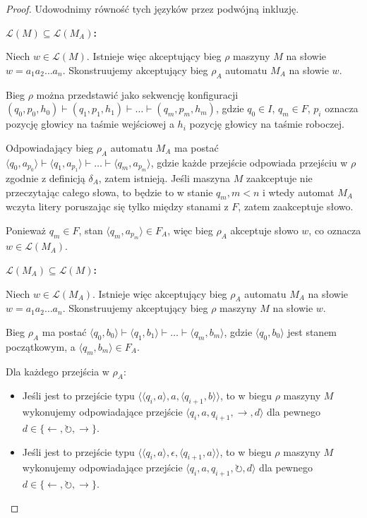 \documentclass{article}
\theoremstyle{definition}
\theoremstyle{remark}
\begin{document}
\begin{proof}
Udowodnimy równość tych języków przez podwójną inkluzję.

\medskip
\noindent\textbf{$\mathcal{L}(M) \subseteq \mathcal{L}(M_A)$:}

Niech $w \in \mathcal{L}(M)$. Istnieje więc akceptujący bieg $\rho$ maszyny $M$ na słowie $w = a_1a_2\ldots a_n$. 
Skonstruujemy akceptujący bieg $\rho_A$ automatu $M_A$ na słowie $w$.

Bieg $\rho$ można przedstawić jako sekwencję konfiguracji $(q_0, p_0, h_0) \vdash (q_1, p_1, h_1) \vdash \ldots \vdash (q_m, p_m, h_m)$, gdzie $q_0 \in I$, $q_m \in F$, $p_i$ oznacza pozycję głowicy na taśmie wejściowej a $h_i$ pozycję głowicy na taśmie roboczej.

Odpowiadający bieg $\rho_A$ automatu $M_A$ ma postać $\langle q_0, a_{p_0} \rangle \vdash \langle q_1, a_{p_1} \rangle \vdash \ldots \vdash \langle q_m, a_{p_m} \rangle$, gdzie każde przejście odpowiada przejściu w $\rho$ zgodnie z definicją $\delta_A$, zatem istnieją.
Jeśli maszyna $M$ zaakceptuje nie przeczytając całego słowa,
to będzie to w stanie \(q_m, m < n\) i wtedy automat \(M_A\) wczyta litery poruszając się tylko między stanami z \(F\), zatem zaakceptuje słowo. 

Ponieważ $q_m \in F$, stan $\langle q_m, a_{p_m} \rangle \in F_A$, więc bieg $\rho_A$ akceptuje słowo $w$, co oznacza $w \in \mathcal{L}(M_A)$.

\medskip
\noindent\textbf{$\mathcal{L}(M_A) \subseteq \mathcal{L}(M)$:}

Niech $w \in \mathcal{L}(M_A)$. Istnieje więc akceptujący bieg $\rho_A$ automatu $M_A$ na słowie $w = a_1a_2\ldots a_n$. 
Skonstruujemy akceptujący bieg $\rho$ maszyny $M$ na słowie $w$.

Bieg $\rho_A$ ma postać $\langle q_0, b_0 \rangle \vdash \langle q_1, b_1 \rangle \vdash \ldots \vdash \langle q_m, b_m \rangle$, gdzie $\langle q_0, b_0 \rangle$ jest stanem początkowym, a $\langle q_m, b_m \rangle \in F_A$.

Dla każdego przejścia w $\rho_A$:
\begin{itemize}
    \item Jeśli jest to przejście typu $\langle \langle q_i, a \rangle, a, \langle q_{i+1}, b \rangle \rangle$, to w biegu $\rho$ maszyny $M$ wykonujemy odpowiadające przejście $\langle q_i, a, q_{i+1}, \rightarrow, d \rangle$ dla pewnego $d \in \{\leftarrow, \circlearrowright, \rightarrow\}$.
    
    \item Jeśli jest to przejście typu $\langle \langle q_i, a \rangle, \epsilon, \langle q_{i+1}, a \rangle \rangle$, to w biegu $\rho$ maszyny $M$ wykonujemy odpowiadające przejście $\langle q_i, a, q_{i+1}, \circlearrowright, d \rangle$ dla pewnego $d \in \{\leftarrow, \circlearrowright, \rightarrow\}$.
\end{itemize}


\end{proof}
\end{document}
